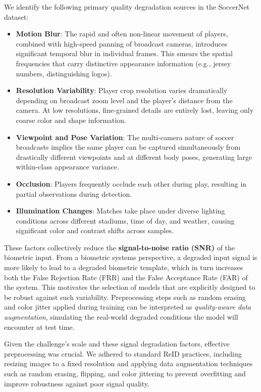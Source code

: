 \documentclass[10pt,twocolumn,letterpaper]{article}
\begin{document}
We identify the following primary quality degradation sources in the SoccerNet dataset:
\begin{itemize}
    \item \textbf{Motion Blur}: The rapid and often non-linear movement of players, combined with high-speed panning of broadcast cameras, introduces significant temporal blur in individual frames. This smears the spatial frequencies that carry distinctive appearance information (e.g., jersey numbers, distinguishing logos).
    \item \textbf{Resolution Variability}: Player crop resolution varies dramatically depending on broadcast zoom level and the player's distance from the camera. At low resolutions, fine-grained details are entirely lost, leaving only coarse color and shape information.
    \item \textbf{Viewpoint and Pose Variation}: The multi-camera nature of soccer broadcasts implies the same player can be captured simultaneously from drastically different viewpoints and at different body poses, generating large within-class appearance variance.
    \item \textbf{Occlusion}: Players frequently occlude each other during play, resulting in partial observations during detection.
    \item \textbf{Illumination Changes}: Matches take place under diverse lighting conditions across different stadiums, time of day, and weather, causing significant color and contrast shifts across samples.
\end{itemize}

These factors collectively reduce the \textbf{signal-to-noise ratio (SNR)} of the biometric input. From a biometric systems perspective, a degraded input signal is more likely to lead to a degraded biometric template, which in turn increases both the False Rejection Rate (FRR) and the False Acceptance Rate (FAR) of the system. This motivates the selection of models that are explicitly designed to be robust against such variability. Preprocessing steps such as random erasing and color jitter applied during training can be interpreted as \textit{quality-aware data augmentation}, simulating the real-world degraded conditions the model will encounter at test time.

Given the challenge's scale and these signal degradation factors, effective preprocessing was crucial. We adhered to standard ReID practices, including resizing images to a fixed resolution and applying data augmentation techniques such as random erasing, flipping, and color jittering to prevent overfitting and improve robustness against poor signal quality.
\end{document}
